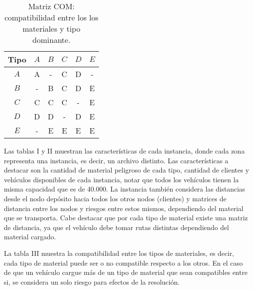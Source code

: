 \documentclass[conference]{IEEEtran}
\begin{document}
\begin{table}[H]
\caption{Matriz COM: compatibilidad entre los los materiales y tipo dominante.}
\begin{center}
\begin{tabular}{|c|c|c|c|c|c|}
\hline
\textbf{Tipo}& $A$ & $B$ & $C$ & $D$ & $E$\\
 
\hline
$A$& A & - & C & D & -\\
\hline
$B$& - & B & C & D & E\\
\hline
$C$& C & C & C & - & E\\
\hline
$D$& D & D & - & D & E\\
\hline
$E$& - & E & E & E & E\\
\hline
\end{tabular}
\label{tab1}
\end{center}
\end{table}

Las tablas I y II muestran las caracter\'isticas de cada instancia, donde cada zona representa una instancia, es decir, un archivo distinto. Las caracter\'isticas a destacar son la cantidad de material peligroso de cada tipo, cantidad de clientes y veh\'iculos disponibles de cada instancia, notar que todos los veh\'iculos tienen la misma capacidad que es de 40.000. La instancia tambi\'en considera las distancias desde el nodo dep\'osito hacia todos los otros nodos (clientes) y matrices de distancia entre los nodos y riesgos entre estos mismos, dependiendo del material que se transporta. Cabe destacar que por cada tipo de material existe una matriz de distancia, ya que el veh\'iculo debe tomar rutas distintas dependiendo del material cargado.

La tabla III muestra la compatibilidad entre los tipos de materiales, es decir, cada tipo de material puede ser o no compatible respecto a los otros. En el caso de que un veh\'iculo cargue m\'as de un tipo de material que sean compatibles entre si, se considera un solo riesgo para efectos de la resoluci\'on. 
\end{document}
